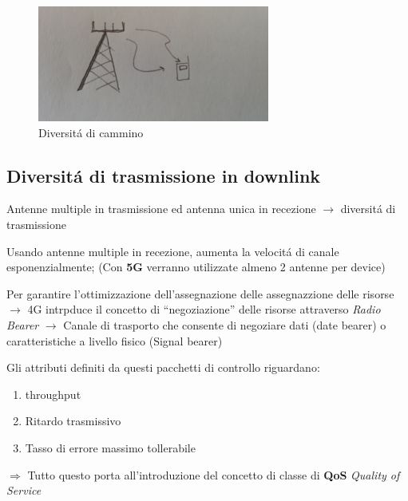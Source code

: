 \documentclass{article}
\begin{document}
\begin{figure}[h]
    \centering
    \includegraphics[width=3in]{img/diversi_cammini.jpg}
    \caption{Diversit\'a di cammino}
\end{figure}
\subsection{Diversit\'a di trasmissione in downlink}

Antenne multiple in trasmissione ed antenna unica in recezione $\rightarrow$ diversit\'a di trasmissione

Usando antenne multiple in recezione, aumenta la velocit\'a di canale esponenzialmente; (Con \textbf{5G} verranno utilizzate almeno 2 antenne per device)


Per garantire l'ottimizzazione dell'assegnazione delle assegnazzione delle risorse $\rightarrow$ 4G intrpduce il concetto di ``negoziazione'' delle risorse attraverso \textit{Radio Bearer} $\rightarrow$ Canale di trasporto che consente  di negoziare dati (date bearer) o caratteristiche a livello fisico (Signal bearer)

Gli attributi definiti da questi pacchetti di controllo riguardano:

\begin{enumerate}
    \item throughput
    \item Ritardo trasmissivo
    \item Tasso di errore massimo tollerabile
\end{enumerate}

$\Rightarrow$ Tutto questo porta all'introduzione del concetto di classe  di \textbf{QoS} \textit{Quality of Service}
\end{document}
